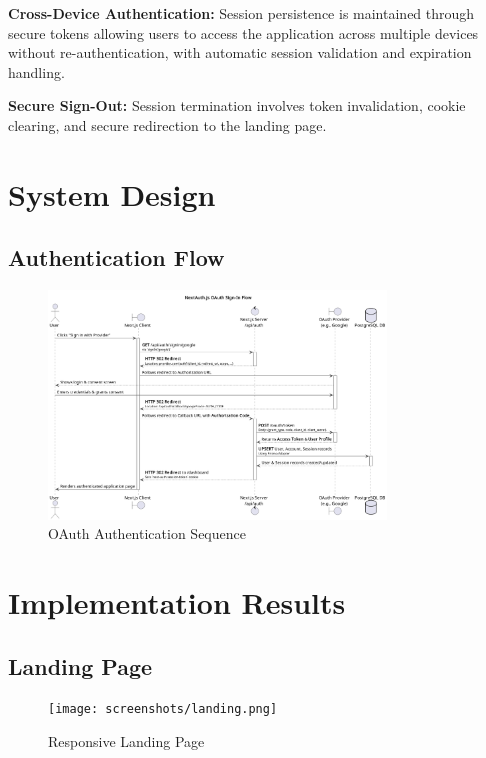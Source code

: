 \textbf{Cross-Device Authentication:}
Session persistence is maintained through secure tokens allowing users to access the application across multiple devices without re-authentication, with automatic session validation and expiration handling.

\textbf{Secure Sign-Out:}
Session termination involves token invalidation, cookie clearing, and secure redirection to the landing page.

\section{System Design}

\subsection{Authentication Flow}
\begin{figure}[H]
    \centering
    \includegraphics[width=0.8\textwidth]{conception/SprintII/sequence_diagrams/sequence_authentication_1_1_AuthenticateUsingGoogleAccount.png}
    \caption{OAuth Authentication Sequence}
    \label{fig:seq_google_auth}
\end{figure}


\section{Implementation Results}

\subsection{Landing Page}
\begin{figure}[H]
    \centering
    \texttt{[image: screenshots/landing.png]}
    \caption{Responsive Landing Page}
    \label{fig:landing_page}
\end{figure}

